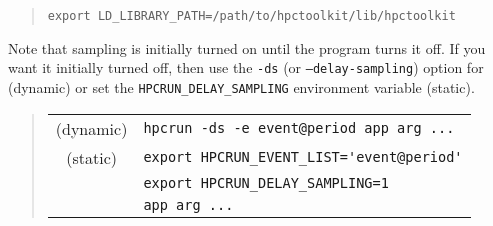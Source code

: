 \begin{quote}
\begin{verbatim}
export LD_LIBRARY_PATH=/path/to/hpctoolkit/lib/hpctoolkit
\end{verbatim}
\end{quote}

Note that sampling is initially turned on until the program turns it
off.  If you want it initially turned off, then use the {\tt -ds} (or
{\tt --delay-sampling}) option for \hpcrun{} (dynamic) or set the
\verb|HPCRUN_DELAY_SAMPLING| environment variable (static).

\begin{quote}
\begin{tabular}{@{}cl}
(dynamic) & \verb|hpcrun -ds -e event@period app arg ...|  \\
(static)  & \verb|export HPCRUN_EVENT_LIST='event@period'| \\
& \verb|export HPCRUN_DELAY_SAMPLING=1| \\
& \verb|app arg ...|
\end{tabular}
\end{quote}

